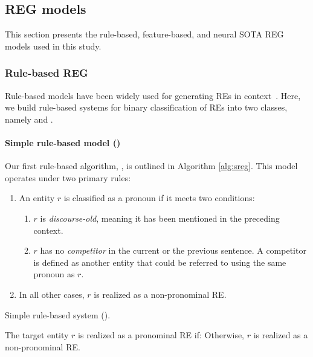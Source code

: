 


\subsection{REG models}\label{sec:model}

This section presents the rule-based, feature-based, and neural SOTA REG models used in this study.

\subsubsection{Rule-based REG} 

Rule-based models have been widely used for generating REs in context~\citep{mccoy1999generating, henschel2000pronominalization}. 
Here, we build rule-based systems for binary classification of REs into two classes, namely  and .

\paragraph*{Simple rule-based model ()}

Our first rule-based algorithm, , is outlined in Algorithm \ref{alg:sreg}. This model operates under two primary rules:

\begin{enumerate}
	\item An entity $r$ is classified as a pronoun if it meets two conditions:
	\begin{enumerate}
		\item $r$ is \textit{discourse-old}, meaning it has been mentioned in the preceding context.
		\item $r$ has no \textit{competitor} in the current or the previous sentence. A competitor is defined as another entity that could be referred to using the same pronoun as $r$.
	\end{enumerate}
	\item In all other cases, $r$ is realized as a non-pronominal RE.
\end{enumerate}

\begin{algorithm}
	\caption{Simple rule-based system ().}
	\label{alg:sreg}
	{The target entity $r$ is realized as a pronominal RE if:\;}{
		\;
		\;
		\hspace{0cm} Otherwise, $r$ is realized as a non-pronominal RE.}
	
\end{algorithm}

